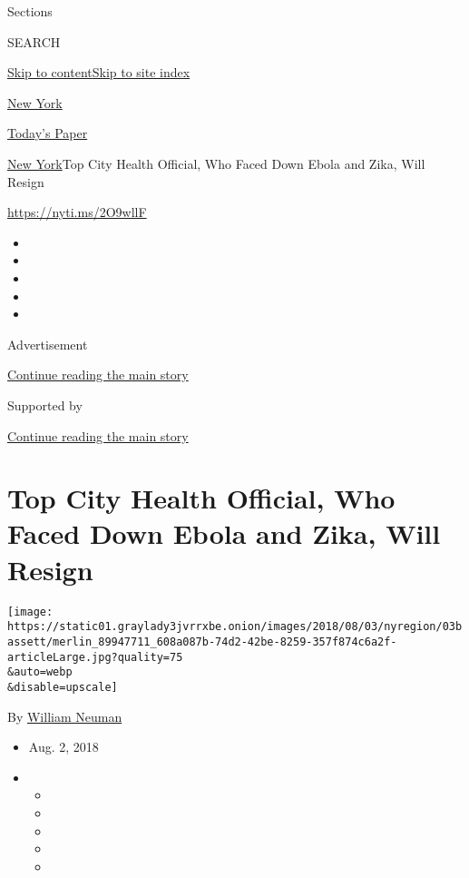 Sections

SEARCH

\protect\hyperlink{site-content}{Skip to
content}\protect\hyperlink{site-index}{Skip to site index}

\href{https://www.nytimes3xbfgragh.onion/section/nyregion}{New York}

\href{https://myaccount.nytimes3xbfgragh.onion/auth/login?response_type=cookie\&client_id=vi}{}

\href{https://www.nytimes3xbfgragh.onion/section/todayspaper}{Today's
Paper}

\href{/section/nyregion}{New York}\textbar{}Top City Health Official,
Who Faced Down Ebola and Zika, Will Resign

\url{https://nyti.ms/2O9wllF}

\begin{itemize}
\item
\item
\item
\item
\item
\end{itemize}

Advertisement

\protect\hyperlink{after-top}{Continue reading the main story}

Supported by

\protect\hyperlink{after-sponsor}{Continue reading the main story}

\hypertarget{top-city-health-official-who-faced-down-ebola-and-zika-will-resign}{%
\section{Top City Health Official, Who Faced Down Ebola and Zika, Will
Resign}\label{top-city-health-official-who-faced-down-ebola-and-zika-will-resign}}

\texttt{[image: https://static01.graylady3jvrrxbe.onion/images/2018/08/03/nyregion/03bassett/merlin\_89947711\_608a087b-74d2-42be-8259-357f874c6a2f-articleLarge.jpg?quality=75\\\&auto=webp\\\&disable=upscale]}

By \href{https://www.nytimes3xbfgragh.onion/by/william-neuman}{William
Neuman}

\begin{itemize}
\item
  Aug. 2, 2018
\item
  \begin{itemize}
  \item
  \item
  \item
  \item
  \item
  \end{itemize}
\end{itemize}

